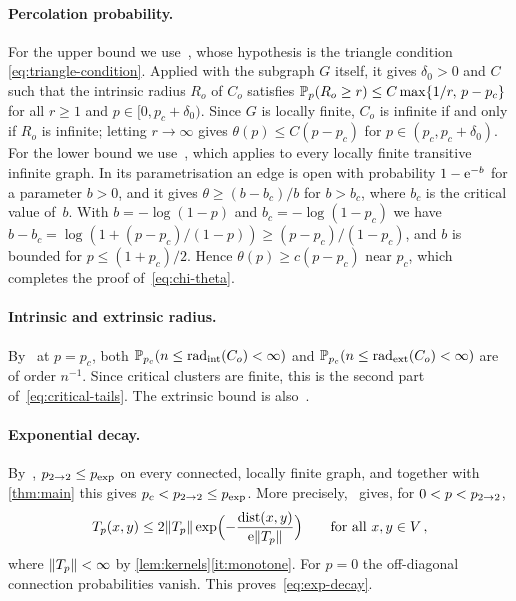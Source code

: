 \paragraph{Percolation probability.}
For the upper bound we use~\cite[Lemma~2.1]{Hut22sup}, whose hypothesis is the triangle condition
\eqref{eq:triangle-condition}. Applied with the subgraph $G$ itself, it gives $\delta_0>0$ and $C$ such
that the intrinsic radius $R_o$ of $C_o$ satisfies $\mathbb P_p(R_o\ge r)\le C\max\{1/r,\,p-p_c\}$ for all
$r\ge1$ and $p\in[0,p_c+\delta_0)$. Since $G$ is locally finite, $C_o$ is infinite if and only if $R_o$
is infinite; letting $r\to\infty$ gives $\theta(p)\le C(p-p_c)$ for $p\in(p_c,p_c+\delta_0)$. For the
lower bound we use~\cite[Theorem~1.1]{DCT16}, which applies to every locally finite transitive infinite
graph. In its parametrisation an edge is open with probability $1-\mathrm{e}^{-b}$ for a parameter $b>0$, and
it gives $\theta\ge(b-b_c)/b$ for $b>b_c$, where $b_c$ is the critical value of~$b$. With $b=-\log(1-p)$
and $b_c=-\log(1-p_c)$ we have $b-b_c=\log(1+(p-p_c)/(1-p))\ge(p-p_c)/(1-p_c)$, and $b$ is
bounded for $p\le(1+p_c)/2$. Hence $\theta(p)\ge c(p-p_c)$ near $p_c$, which completes the
proof of~\eqref{eq:chi-theta}.

\paragraph{Intrinsic and extrinsic radius.}
By~\cite[Theorem~1.2]{Hut22sup} at $p=p_c$, both $\mathbb P_{p_c}(n\le\operatorname{rad}_{\mathrm{int}}(C_o)<\infty)$ and
$\mathbb P_{p_c}(n\le\operatorname{rad}_{\mathrm{ext}}(C_o)<\infty)$ are of order $n^{-1}$. Since critical clusters are finite, this is
the second part of~\eqref{eq:critical-tails}. The extrinsic bound is also~\cite[Theorem~3.1]{Hut20L2}.

\paragraph{Exponential decay.}
By~\cite[Theorem~2.2]{Hut20L2}, $p_{2\to 2}\le p_{\mathrm{exp}}$ on every connected, locally finite graph, and together
with \cref{thm:main} this gives $p_c<p_{2\to 2}\le p_{\mathrm{exp}}$. More precisely,~\cite[Remark~2.3]{Hut20L2} gives,
for $0<p<p_{2\to 2}$,
\begin{equation*}
  T_p(x,y)\le2\lVert T_p\rVert\exp\Bigl(-\frac{\operatorname{dist}(x,y)}{\mathrm{e}\lVert T_p\rVert}\Bigr)\qquad\text{for all }x,y\in V\,,
\end{equation*}
where $\lVert T_p\rVert<\infty$ by \cref{lem:kernels}\ref{it:monotone}. For $p=0$ the off-diagonal
connection probabilities vanish. This proves~\eqref{eq:exp-decay}.
